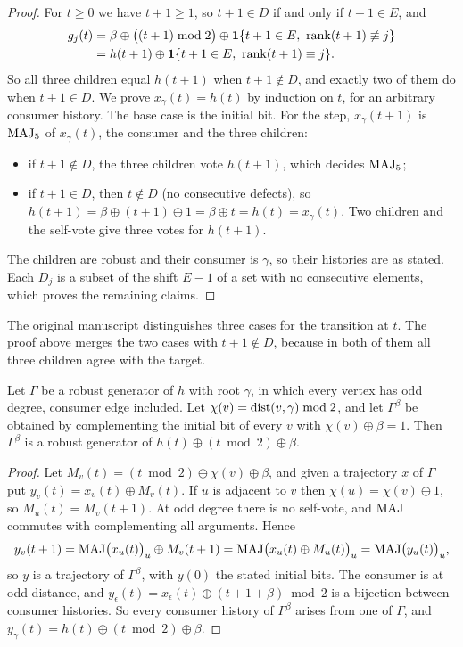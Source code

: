 \begin{proof}
For $t\ge0$ we have $t+1\ge1$, so $t+1\in D$ if and only if $t+1\in E$, and
\[
\begin{aligned}
g_j(t)&=\beta\oplus\bigl((t+1)\bmod 2\bigr)\oplus\one\{t+1\in E,\ \rank(t+1)\not\equiv j\}\\
&=h(t+1)\oplus\one\{t+1\in E,\ \rank(t+1)\equiv j\}.
\end{aligned}
\]
So all three children equal $h(t+1)$ when $t+1\notin D$, and exactly two of them do when $t+1\in D$.
We prove $x_\gamma(t)=h(t)$ by induction on $t$, for an arbitrary consumer history. The base case is
the initial bit. For the step, $x_\gamma(t+1)$ is $\operatorname{MAJ}_5$ of $x_\gamma(t)$, the consumer and the
three children:
\begin{itemize}
\item if $t+1\notin D$, the three children vote $h(t+1)$, which decides $\operatorname{MAJ}_5$;
\item if $t+1\in D$, then $t\notin D$ (no consecutive defects), so
  $h(t+1)=\beta\oplus(t+1)\oplus1=\beta\oplus t=h(t)=x_\gamma(t)$. Two children and the self-vote give
  three votes for $h(t+1)$.
\end{itemize}
The children are robust and their consumer is $\gamma$, so their histories are as stated. Each $D_j$
is a subset of the shift $E-1$ of a set with no consecutive elements, which proves the remaining
claims.
\end{proof}

The original manuscript distinguishes three cases for the transition at $t$. The proof above merges
the two cases with $t+1\notin D$, because in both of them all three children agree with the target.

\begin{lemma}\label{lem:paritytransform}
Let $\Gamma$ be a robust generator of $h$ with root $\gamma$, in which every vertex has odd degree,
consumer edge included. Let $\chi(v)=\operatorname{dist}(v,\gamma)\bmod 2$, and let $\Gamma^\beta$ be obtained by
complementing the initial bit of every $v$ with $\chi(v)\oplus\beta=1$. Then $\Gamma^\beta$ is a robust
generator of $h(t)\oplus(t\bmod2)\oplus\beta$.
\end{lemma}

\begin{proof}
Let $M_v(t)=(t\bmod 2)\oplus\chi(v)\oplus\beta$, and given a trajectory $x$ of $\Gamma$ put
$y_v(t)=x_v(t)\oplus M_v(t)$. If $u$ is adjacent to $v$ then $\chi(u)=\chi(v)\oplus1$, so
$M_u(t)=M_v(t+1)$. At odd degree there is no self-vote, and $\operatorname{MAJ}$ commutes with complementing all
arguments. Hence
\[
y_v(t+1)=\operatorname{MAJ}\bigl(x_u(t)\bigr)_u\oplus M_v(t+1)=\operatorname{MAJ}\bigl(x_u(t)\oplus M_u(t)\bigr)_u=\operatorname{MAJ}\bigl(y_u(t)\bigr)_u,
\]
so $y$ is a trajectory of $\Gamma^\beta$, with $y(0)$ the stated initial bits. The consumer is at odd
distance, and $y_\epsilon(t)=x_\epsilon(t)\oplus(t+1+\beta)\bmod 2$ is a bijection between consumer
histories. So every consumer history of $\Gamma^\beta$ arises from one of $\Gamma$, and
$y_\gamma(t)=h(t)\oplus(t\bmod2)\oplus\beta$.
\end{proof}

